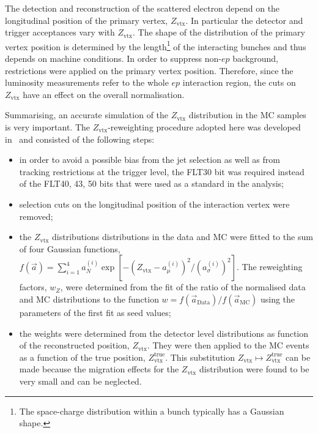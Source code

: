 The detection and reconstruction of the scattered electron depend on the longitudinal position of the primary vertex, $Z_\text{vtx}$. In particular the detector and trigger acceptances vary with $Z_\text{vtx}$. The shape of the distribution of the primary vertex position is determined by the length\footnote{The space-charge distribution within a bunch typically has a Gaussian shape.} of the interacting bunches and thus depends on machine conditions. In order to suppress non-$ep$ background, restrictions were applied on the primary vertex position. Therefore, since the luminosity measurements refer to the whole $ep$ interaction region, the cuts on $Z_\text{vtx}$ have an effect on the overall normalisation. 

Summarising, an accurate simulation of the $Z_\text{vtx}$ distribution in the MC samples is very important. The $Z_\text{vtx}$-reweighting procedure adopted here was developed in~\cite{thesis:behr:2010} and consisted of the following steps:
\begin{itemize}
 \item in order to avoid a possible bias from the jet selection as well as from tracking restrictions at the trigger level, the FLT30 bit was required instead of the FLT40, 43, 50 bits that were used as a standard in the analysis;
 \item selection cuts on the longitudinal position of the interaction vertex were removed;
 \item the $Z_\text{vtx}$ distributions distributions in the data and MC were fitted to the sum of four Gaussian functions, $f\left(\vec a\right)=\sum_{i=1}^4{a_N^{\left(i\right)}\exp{\left[-\left(Z_\text{vtx}-a_{\mu}^{\left(i\right)}\right)^2/\left(a_\sigma^{\left(i\right)}\right)^2\right]}}$. The reweighting factors, $w_{Z}$, were determined from the fit of the ratio of the normalised data and MC distributions to the function $w=f\left(\vec a_{\mathrm{Data}}\right)/f\left(\vec a_{\mathrm{MC}}\right)$ using the parameters of the first fit as seed values;
 \item the weights were determined from the detector level distributions as function of the reconstructed position, $Z_\text{vtx}$. They were then applied to the MC events as a function of the true position, $Z_\text{vtx}^\text{true}$. This substitution $Z_\text{vtx} \mapsto Z_\text{vtx}^\text{true}$ can be made because the migration effects for the $Z_\text{vtx}$ distribution were found to be very small and can be neglected.
\end{itemize}

